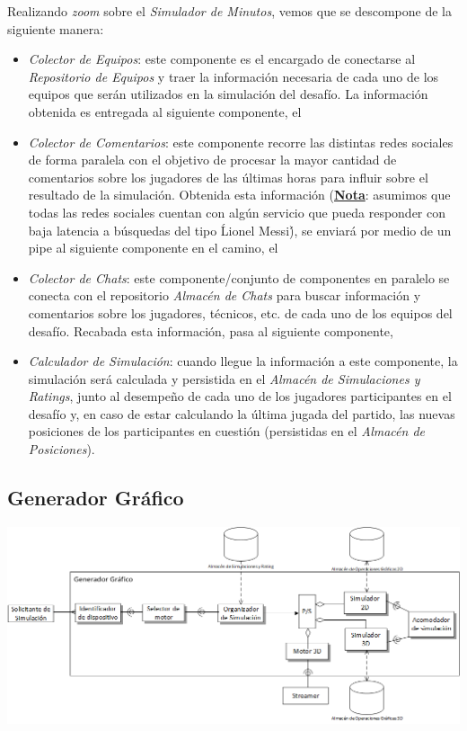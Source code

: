 Realizando \emph{zoom} sobre el \emph{Simulador de Minutos}, vemos que se descompone de la siguiente manera:
\begin{itemize}
 \item \emph{Colector de Equipos}: este componente es el encargado de conectarse al \emph{Repositorio de Equipos} y traer la información necesaria de cada uno de los equipos que serán utilizados en la simulación del desafío. La información obtenida es entregada al siguiente componente, el
 \item \emph{Colector de Comentarios}: este componente recorre las distintas redes sociales de forma paralela con el objetivo de procesar la mayor cantidad de comentarios sobre los jugadores de las últimas horas para influir sobre el resultado de la simulación. Obtenida esta información (\textbf{\underline{Nota}}: asumimos que todas las redes sociales cuentan con algún servicio que pueda responder con baja latencia a búsquedas del tipo \'Lionel Messi\'), se enviará por medio de un pipe al siguiente componente en el camino, el
 \item \emph{Colector de Chats}: este componente/conjunto de componentes en paralelo se conecta con el repositorio \emph{Almacén de Chats} para buscar información y comentarios sobre los jugadores, técnicos, etc. de cada uno de los equipos del desafío. Recabada esta información, pasa al siguiente componente,
 \item \emph{Calculador de Simulación}: cuando llegue la información a este componente, la simulación será calculada y persistida en el \emph{Almacén de Simulaciones y Ratings}, junto al desempeño de cada uno de los jugadores participantes en el desafío y, en caso de estar calculando la última jugada del partido, las nuevas posiciones de los participantes en cuestión (persistidas en el \emph{Almacén de Posiciones}).
\end{itemize}


\newpage
\subsection{Generador Gráfico}
\begin{center}
\includegraphics[scale=0.86,angle=90]{diagramas/generador_grafico}
\label{fig:generador_grafico}
\end{center}

